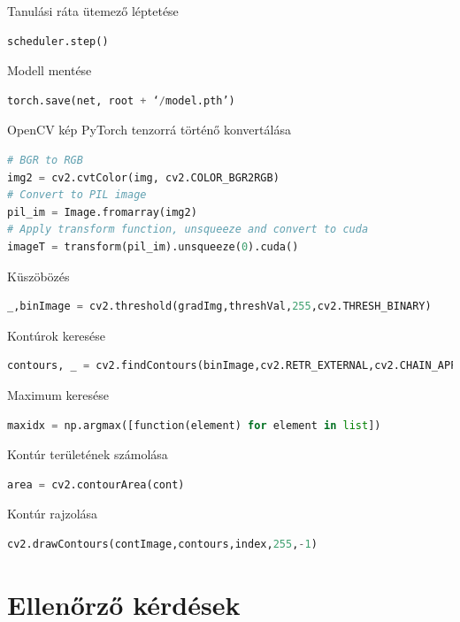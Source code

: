 \documentclass[12pt,a4paper,oneside]{report}             %
\begin{document}
Tanulási ráta ütemező léptetése

\begin{lstlisting}[language=Python]
scheduler.step()
\end{lstlisting}

Modell mentése

\begin{lstlisting}[language=Python]
torch.save(net, root + ‘/model.pth’)
\end{lstlisting}

OpenCV kép PyTorch tenzorrá történő konvertálása

\begin{lstlisting}[language=Python]
# BGR to RGB
img2 = cv2.cvtColor(img, cv2.COLOR_BGR2RGB)
# Convert to PIL image
pil_im = Image.fromarray(img2)
# Apply transform function, unsqueeze and convert to cuda
imageT = transform(pil_im).unsqueeze(0).cuda()
\end{lstlisting}

Küszöbözés

\begin{lstlisting}[language=Python]
_,binImage = cv2.threshold(gradImg,threshVal,255,cv2.THRESH_BINARY)
\end{lstlisting}

Kontúrok keresése

\begin{lstlisting}[language=Python]
contours, _ = cv2.findContours(binImage,cv2.RETR_EXTERNAL,cv2.CHAIN_APPROX_SIMPLE)
\end{lstlisting}

Maximum keresése

\begin{lstlisting}[language=Python]
maxidx = np.argmax([function(element) for element in list])
\end{lstlisting}

Kontúr területének számolása

\begin{lstlisting}[language=Python]
area = cv2.contourArea(cont)
\end{lstlisting}

Kontúr rajzolása

\begin{lstlisting}[language=Python]
cv2.drawContours(contImage,contours,index,255,-1)
\end{lstlisting}



\chapter{Ellenőrző kérdések}
\end{document}

